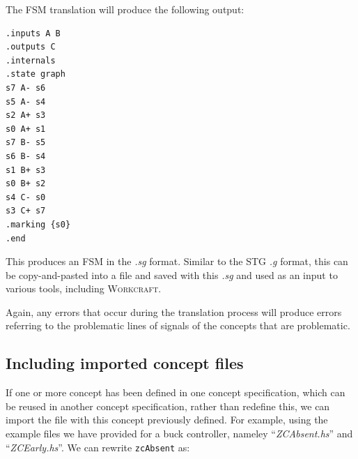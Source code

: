 \documentclass[british,technote,compsoc]{IEEEtran}
\newcommand{\noun}[1]{\textsc{#1}}
\begin{document}
The FSM translation will produce the following output:

\begin{verbatim}
.inputs A B
.outputs C
.internals
.state graph
s7 A- s6
s5 A- s4
s2 A+ s3
s0 A+ s1
s7 B- s5
s6 B- s4
s1 B+ s3
s0 B+ s2
s4 C- s0
s3 C+ s7
.marking {s0}
.end
\end{verbatim}

This produces an FSM in the \emph{.sg} format. Similar to the STG \emph{.g} format, this can be copy-and-pasted into a file and saved with this \emph{.sg} and used as an input to various
tools, including \noun{Workcraft}.

Again, any errors that occur during the translation process will produce errors referring to the problematic lines of signals of the concepts that are problematic. 

\subsection{Including imported concept files\label{sub:includes}}

If one or more concept has been defined in one concept specification, which can be reused in another concept specification, rather than redefine this, we can
import the file with this concept previously defined. For example, using the example files we have provided for a buck controller, nameley ``\emph{ZCAbsent.hs}'' and ``\emph{ZCEarly.hs}''. 
We can rewrite \texttt{zcAbsent} as:
\end{document}
